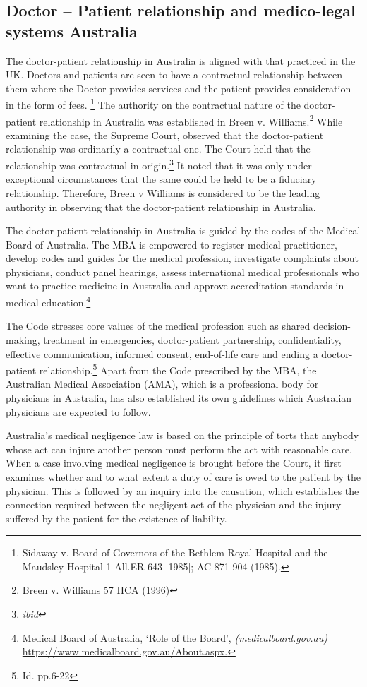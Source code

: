 \begin{multicols}{2}
\subsection*{Doctor – Patient relationship and medico-legal systems Australia}

\noi
The doctor-patient relationship in Australia is aligned with that practiced in the UK. Doctors and patients are seen to have a contractual relationship between them where the Doctor provides services and the patient provides consideration in the form of fees. \footnote{Sidaway v. Board of Governors of the Bethlem Royal Hospital and the Maudsley Hospital 1 All.ER
643 [1985]; AC 871 904 (1985).} The authority on the contractual nature of the doctor-patient relationship in Australia was established in Breen v. Williams.\footnote{Breen v. Williams 57 HCA (1996)} While examining the case, the Supreme Court, observed that the doctor-patient relationship was ordinarily a contractual one. The Court held that the relationship was contractual in origin.\footnote{\textit{ibid}} It noted that it was only under exceptional circumstances that the same could be held to be a fiduciary relationship. Therefore, Breen v Williams is considered to be the leading authority in observing that the doctor-patient relationship in Australia.

\noi
The doctor-patient relationship in Australia is guided by the codes of the Medical Board  of Australia. The MBA is empowered to register medical practitioner, develop codes and guides for the medical profession, investigate complaints about physicians, conduct panel hearings, assess international medical professionals who want to practice medicine in Australia and approve accreditation standards in medical education.\footnote{Medical Board of Australia, ‘Role of the Board’, \textit{(medicalboard.gov.au)} \url{https://www.medicalboard.gov.au/About.aspx.}}

\noi
The Code stresses core values of the medical profession such as shared decision-making,
treatment in emergencies, doctor-patient partnership, confidentiality, effective
communication, informed consent, end-of-life care and ending a doctor-patient
relationship.\footnote{Id. pp.6-22} Apart from the Code prescribed by the MBA, the Australian Medical
Association (AMA), which is a professional body for physicians in Australia, has also
established its own guidelines which Australian physicians are expected to follow.

\noi
Australia’s medical negligence law is based on the principle of torts that anybody whose
act can injure another person must perform the act with reasonable care. When a case
involving medical negligence is brought before the Court, it first examines whether and
to what extent a duty of care is owed to the patient by the physician. This is followed by
an inquiry into the causation, which establishes the connection required between the negligent act of the physician and the injury suffered by the patient for the existence of liability.


\end{multicols}
